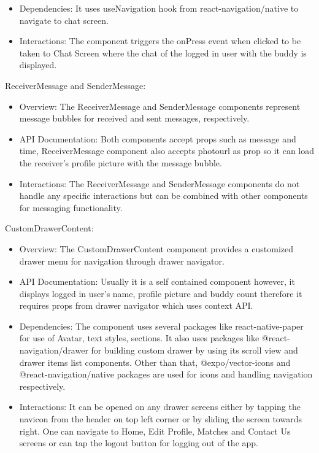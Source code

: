 \begin{compactenum}
\begin{itemize}
        \item Dependencies: It uses useNavigation hook from react-navigation/native to navigate to chat screen.
        \item Interactions: The component triggers the onPress event when clicked to be taken to Chat Screen where the chat of the logged in user with the buddy is displayed.
    \end{itemize}
    \item ReceiverMessage and SenderMessage:
    \begin{itemize}
        \item Overview: The ReceiverMessage and SenderMessage components represent message bubbles for received and sent messages, respectively.
        \item API Documentation: Both components accept props such as message and time, ReceiverMessage component also accepts photourl as prop so it can load the receiver's profile picture with the message bubble.
        \item Interactions: The ReceiverMessage and SenderMessage components do not handle any specific interactions but can be combined with other components for messaging functionality.
    \end{itemize}
    \item CustomDrawerContent:
    \begin{itemize}
        \item Overview: The CustomDrawerContent component provides a customized drawer menu for navigation through drawer navigator. 
        \item API Documentation: Usually it is a self contained component however, it displays logged in user's name, profile picture and buddy count therefore it requires props from drawer navigator which uses context API.
        \item Dependencies: The component uses several packages like react-native-paper for use of Avatar, text styles, sections. It also uses packages like @react-navigation/drawer for building custom drawer by using its scroll view and drawer items list components. Other than that, @expo/vector-icons and @react-navigation/native packages are used for icons and handling navigation respectively.
        \item Interactions: It can be opened on any drawer screens either by tapping the navicon from the header on top left corner or by sliding the screen towards right. One can navigate to Home, Edit Profile, Matches and Contact Us screens or can tap the logout button for logging out of the app.

\end{itemize}
\end{compactenum}

